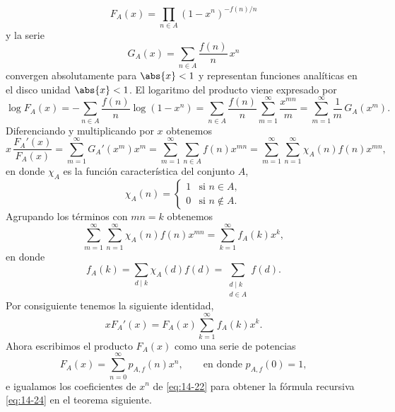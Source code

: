     \begin{equation*}
        F_A(x)=\prod_{n\in A}(1-x^n)^{-f(n)/n}
    \end{equation*}
    y la serie
    \begin{equation*}
        G_A(x)=\sum_{n\in A}\frac{f(n)}{n}\,x^n
    \end{equation*}
    convergen absolutamente para $\abs{x}<1$ y representan funciones analíticas en el disco
    unidad $\abs{x}<1$. El logaritmo del producto viene expresado por
    \begin{equation*}
        \log F_A(x)=-\sum_{n\in A}\frac{f(n)}{n}\log(1-x^n)=\sum_{n\in A}\frac{f(n)}{n}\sum_{m=1}^{\infty}\frac{x^{mn}}{m}=\sum_{m=1}^{\infty}\frac{1}{m}\,G_A(x^m).
    \end{equation*}
    Diferenciando y multiplicando por $x$ obtenemos
    \begin{equation*}
        x\,\frac{F_A'(x)}{F_A(x)}=\sum_{m=1}^{\infty}G_A'(x^m)x^m=\sum_{m=1}^{\infty}\sum_{n\in A}f(n)x^{mn}=\sum_{m=1}^{\infty}\sum_{n=1}^{\infty}\chi_A(n)f(n)x^{mn},
    \end{equation*}
    en donde $\chi_A$ es la función característica del conjunto $A$,
    \begin{equation*}
        \chi_A(n)=
        \begin{cases}
            1&\text{si }n\in A,\\
            0&\text{si }n\notin A.
        \end{cases}
    \end{equation*}
    Agrupando los términos con $mn=k$ obtenemos
    \begin{equation*}
        \sum_{m=1}^{\infty}\sum_{n=1}^{\infty}\chi_A(n)f(n)x^{mn}=\sum_{k=1}^{\infty}f_A(k)x^k,
    \end{equation*}
    en donde
    \begin{equation*}
        f_A(k)=\sum_{d\mid k}\chi_A(d)f(d)=\sum_{\substack{d\mid k\\d\in A}}f(d).
    \end{equation*}
    Por consiguiente tenemos la siguiente identidad,
    \begin{equation}\label{eq:14-22}
        xF_A'(x)=F_A(x)\sum_{k=1}^{\infty}f_A(k)x^k.
    \end{equation}
    Ahora escribimos el producto $F_A(x)$ como una serie de potencias
    \begin{equation*}
        F_A(x)=\sum_{n=0}^{\infty}p_{A,f}(n)x^n,\qquad\text{en donde }p_{A,f}(0)=1,
    \end{equation*}
    e igualamos los coeficientes de $x^n$ de \eqref{eq:14-22} para obtener la fórmula recursiva
    \eqref{eq:14-24} en el teorema siguiente.

